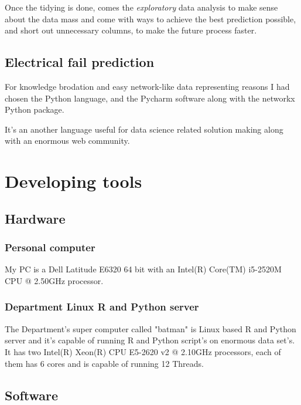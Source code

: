 Once the tidying is done, comes the \textit{exploratory} data analysis to make sense about the data mass and come with ways to achieve the best prediction possible, and short out unnecessary columns, to make the future process faster.
		\subsection{Electrical fail prediction}
For knowledge brodation and easy network-like data representing reasons I had chosen the Python language, and the Pycharm software along with the networkx Python package.

It's an another language useful for data science related solution making along with an enormous web community.
	\section{Developing tools}
		\subsection{Hardware}
			\subsubsection{Personal computer}
My PC is a Dell Latitude E6320 64 bit with an Intel(R) Core(TM) i5-2520M CPU @ 2.50GHz processor.
\cite{Latitude}
			\subsubsection{Department Linux R and Python server}
The Department's super computer called "batman" is Linux based R and Python server and it's capable of running R and Python script's on enormous data set's. It has two Intel(R) Xeon(R) CPU E5-2620 v2 @ 2.10GHz processors, each of them has 6 cores and is capable of running 12 Threads.
\cite{Batman}
		\subsection{Software}
